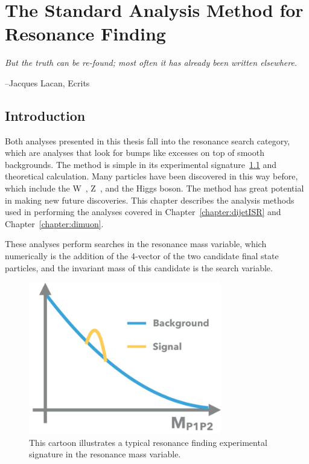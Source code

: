 \chapter{The Standard Analysis Method for Resonance Finding}
\label{chapter:analysismethod}

\epigraph{\textit{But the truth can be re-found; most often it has already been written elsewhere.}}{--Jacques Lacan, Ecrits}


\section{Introduction}
Both analyses presented in this thesis fall into the resonance search category, which are analyses that look for bumps like excesses on top of smooth backgrounds. The method is simple in its experimental signature~\ref{fig:bump} and theoretical calculation. Many particles have been discovered in this way before, which include the W~\cite{Arnison:142059}, Z~\cite{hollik1984composite}, and the Higgs boson. The method has great potential in making new future discoveries. This chapter describes
the analysis methods used in performing the analyses covered in Chapter~\ref{chapter:dijetISR} and Chapter~\ref{chapter:dimuon}. 

These analyses perform searches in the resonance mass variable, which numerically is the addition of the 4-vector of the two candidate final state particles, and the invariant mass of this candidate is the search variable.

\begin{figure}[!htb]
    \begin{center}
        \includegraphics[width=0.75\textwidth]{figures/chapter_analysismethod/resonance}
        \caption{
            This cartoon illustrates a typical resonance finding experimental signature in the resonance mass variable. 
        }
        \label{fig:bump}
    \end{center}
\end{figure}
\FloatBarrier

